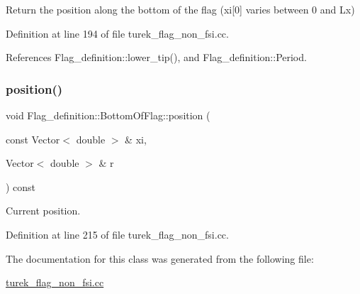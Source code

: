 Return the position along the bottom of the flag (xi\mbox{[}0\mbox{]} varies between 0 and Lx) 



Definition at line 194 of file turek\+\_\+flag\+\_\+non\+\_\+fsi.\+cc.



References Flag\+\_\+definition\+::lower\+\_\+tip(), and Flag\+\_\+definition\+::\+Period.

\mbox{\label{classFlag__definition_1_1BottomOfFlag_aa534848e399e6fa14a279ec45142df87}} 
\subsubsection{\texorpdfstring{position()}{position()}\hspace{0.1cm}{\footnotesize\ttfamily [2/2]}}
{\footnotesize\ttfamily void Flag\+\_\+definition\+::\+Bottom\+Of\+Flag\+::position (\begin{DoxyParamCaption}\item[{const Vector$<$ double $>$ \&}]{xi,  }\item[{Vector$<$ double $>$ \&}]{r }\end{DoxyParamCaption}) const\hspace{0.3cm}{\ttfamily [inline]}}



Current position. 



Definition at line 215 of file turek\+\_\+flag\+\_\+non\+\_\+fsi.\+cc.



The documentation for this class was generated from the following file\+:\begin{DoxyCompactItemize}
\item 
\hyperlink{turek__flag__non__fsi_8cc}{turek\+\_\+flag\+\_\+non\+\_\+fsi.\+cc}\end{DoxyCompactItemize}
